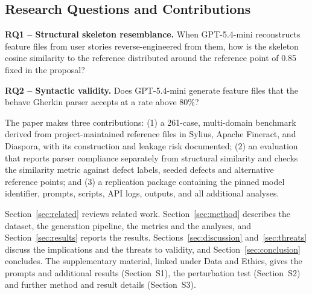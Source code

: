 \subsection{Research Questions and Contributions}

\textbf{RQ1 -- Structural skeleton resemblance.} When GPT-5.4-mini reconstructs feature files from user stories reverse-engineered from them, how is the skeleton cosine similarity to the reference distributed around the reference point of 0.85 fixed in the proposal?

\noindent\textbf{RQ2 -- Syntactic validity.} Does GPT-5.4-mini generate feature files that the behave Gherkin parser accepts at a rate above 80\%?

The paper makes three contributions: (1) a 261-case, multi-domain benchmark derived from project-maintained reference files in Sylius, Apache Fineract, and Diaspora, with its construction and leakage risk documented; (2) an evaluation that reports parser compliance separately from structural similarity and checks the similarity metric against defect labels, seeded defects and alternative reference points; and (3) a replication package containing the pinned model identifier, prompts, scripts, API logs, outputs, and all additional analyses.

Section~\ref{sec:related} reviews related work. Section~\ref{sec:method} describes the dataset, the generation pipeline, the metrics and the analyses, and Section~\ref{sec:results} reports the results. Sections~\ref{sec:discussion} and~\ref{sec:threats} discuss the implications and the threats to validity, and Section~\ref{sec:conclusion} concludes. The supplementary material, linked under Data and Ethics, gives the prompts and additional results (Section~S1), the perturbation test (Section~S2) and further method and result details (Section~S3).
